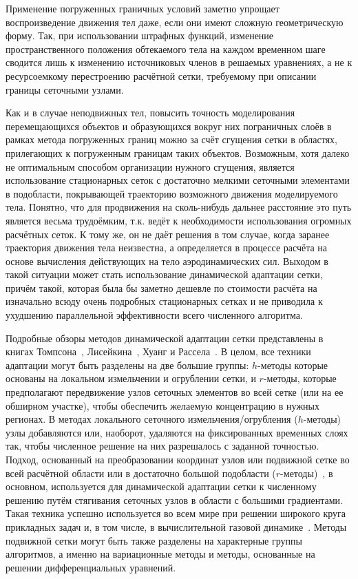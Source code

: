 	Применение погруженных граничных условий заметно упрощает воспроизведение движения тел даже, если они имеют сложную геометрическую форму. Так, при использовании штрафных функций, изменение пространственного положения обтекаемого тела на каждом временном шаге сводится лишь к изменению источниковых членов в решаемых уравнениях, а не к ресурсоемкому перестроению расчётной сетки, требуемому при описании границы сеточными узлами.

	Как и в случае неподвижных тел, повысить точность моделирования перемещающихся объектов и образующихся вокруг них пограничных слоёв в рамках метода погруженных границ можно за счёт сгущения сетки в областях, прилегающих к погруженным границам таких объектов. Возможным, хотя далеко не оптимальным способом  организации нужного сгущения, является использование стационарных сеток с достаточно мелкими сеточными элементами в подобласти, покрывающей траекторию возможного движения моделируемого тела. Понятно, что для продвижения на сколь-нибудь дальнее расстояние это путь является весьма трудоёмким, т.к. ведёт к необходимости использования огромных расчётных сеток. К тому же, он не даёт решения в том случае, когда заранее траектория движения тела неизвестна, а определяется в процессе расчёта на основе вычисления действующих на тело аэродинамических сил. Выходом в такой ситуации может стать использование динамической адаптации сетки, причём такой, которая была бы заметно дешевле по стоимости расчёта на изначально всюду очень подробных стационарных сетках и не приводила к ухудшению параллельной эффективности всего численного алгоритма. 
	
	Подробные обзоры методов динамической адаптации сетки представлены в книгах Томпсона~\cite{thompson_handbook_1998}, Лисейкина~\cite{liseikin2009grid}, Хуанг и Рассела~\cite{huang_adaptive_2011}. В целом, все техники адаптации могут быть разделены на две большие группы: $h$-методы которые основаны на локальном измельчении и огрублении сетки, и $r$-методы, которые предполагают передвижение узлов сеточных элементов во всей сетке (или на ее обширном участке), чтобы обеспечить желаемую концентрацию в нужных регионах. В методах локального сеточного измельчения/огрубления ($h$-методы)~\cite{adjerid_high-order_1992,eriksson_adaptive_1991,babuska_p-and_1990} узлы добавляются или, наоборот, удаляются на фиксированных временных слоях так, чтобы численное решение на них разрешалось с заданной точностью. Подход, основанный на преобразовании координат узлов или подвижной сетке во всей расчётной области или в достаточно большой подобласти ($r$-методы)~\cite{huang_adaptive_2011}, в основном, используется для динамической адаптации сетки к численному решению путём стягивания сеточных узлов в области с большими градиентами. Такая техника успешно используется во всем мире при решении широкого круга прикладных задач и, в том числе, в вычислительной газовой динамике~\cite{baker_mesh_1997,breslavskii_dynamic_2008,yanenko_methods_1976}. Методы подвижной сетки могут быть также разделены на характерные группы алгоритмов, а именно на вариационные методы и методы, основанные на решении дифференциальных уравнений.
	
